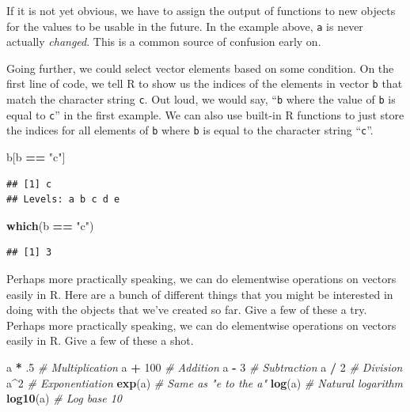 \documentclass[
]{book}
\newenvironment{Shaded}{\begin{snugshade}}{\end{snugshade}}
\newcommand{\CommentTok}[1]{\textcolor[rgb]{0.56,0.35,0.01}{\textit{#1}}}
\newcommand{\DecValTok}[1]{\textcolor[rgb]{0.00,0.00,0.81}{#1}}
\newcommand{\FloatTok}[1]{\textcolor[rgb]{0.00,0.00,0.81}{#1}}
\newcommand{\KeywordTok}[1]{\textcolor[rgb]{0.13,0.29,0.53}{\textbf{#1}}}
\newcommand{\NormalTok}[1]{#1}
\newcommand{\OperatorTok}[1]{\textcolor[rgb]{0.81,0.36,0.00}{\textbf{#1}}}
\newcommand{\StringTok}[1]{\textcolor[rgb]{0.31,0.60,0.02}{#1}}
\begin{document}
If it is not yet obvious, we have to assign the output of functions to new objects for the values to be usable in the future. In the example above, \texttt{a} is never actually \emph{changed}. This is a common source of confusion early on.

Going further, we could select vector elements based on some condition. On the first line of code, we tell R to show us the indices of the elements in vector \texttt{b} that match the character string \texttt{c}. Out loud, we would say, ``\texttt{b} where the value of \texttt{b} is equal to \texttt{c}'' in the first example. We can also use built-in R functions to just store the indices for all elements of \texttt{b} where \texttt{b} is equal to the character string ``\texttt{c}''.

\begin{Shaded}
\begin{Highlighting}[]
\NormalTok{b[b }\OperatorTok{==}\StringTok{ "c"}\NormalTok{]}
\end{Highlighting}
\end{Shaded}

\begin{verbatim}
## [1] c
## Levels: a b c d e
\end{verbatim}

\begin{Shaded}
\begin{Highlighting}[]
\KeywordTok{which}\NormalTok{(b }\OperatorTok{==}\StringTok{ "c"}\NormalTok{)}
\end{Highlighting}
\end{Shaded}

\begin{verbatim}
## [1] 3
\end{verbatim}

Perhaps more practically speaking, we can do elementwise operations on vectors easily in R. Here are a bunch of different things that you might be interested in doing with the objects that we've created so far. Give a few of these a try.
Perhaps more practically speaking, we can do elementwise operations on vectors easily in R. Give a few of these a shot.

\begin{Shaded}
\begin{Highlighting}[]
\NormalTok{a }\OperatorTok{*}\StringTok{ }\FloatTok{.5} \CommentTok{# Multiplication}
\NormalTok{a }\OperatorTok{+}\StringTok{ }\DecValTok{100} \CommentTok{# Addition}
\NormalTok{a }\OperatorTok{-}\StringTok{ }\DecValTok{3} \CommentTok{# Subtraction}
\NormalTok{a }\OperatorTok{/}\StringTok{ }\DecValTok{2} \CommentTok{# Division}
\NormalTok{a}\OperatorTok{^}\DecValTok{2} \CommentTok{# Exponentiation}
\KeywordTok{exp}\NormalTok{(a) }\CommentTok{# Same as "e to the a"}
\KeywordTok{log}\NormalTok{(a) }\CommentTok{# Natural logarithm}
\KeywordTok{log10}\NormalTok{(a) }\CommentTok{# Log base 10}
\end{Highlighting}
\end{Shaded}
\end{document}
